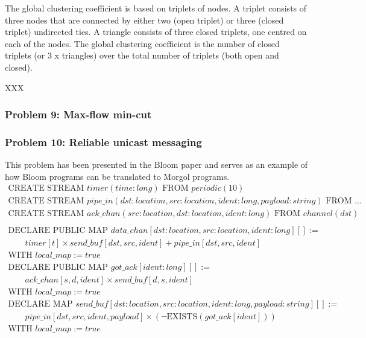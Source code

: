 \documentclass[11pt]{article}
\begin{document}
The global clustering coefficient is based on triplets of nodes. A triplet consists of three nodes that are connected by either two (open triplet) or three (closed triplet) undirected ties. A triangle consists of three closed triplets, one centred on each of the nodes. The global clustering coefficient is the number of closed triplets (or 3 x triangles) over the total number of triplets (both open and closed).

XXX

\subsubsection*{Problem 9: Max-flow min-cut} 


\subsubsection*{Problem 10: Reliable unicast messaging}
This problem has been presented in the Bloom paper and serves as an example of how Bloom programs can be translated to Morgol programs.
\[
\begin{array}{l}
\text{CREATE STREAM } timer(time: long) \text{ FROM } periodic(10) \\
\text{CREATE STREAM } pipe\_in(dst : location, src : location, ident : long, payload : string) \text{ FROM } ... \\
\text{CREATE STREAM } ack\_chan(src : location, dst : location, ident : long) \text{ FROM } channel(dst)\\
\\
\text{DECLARE PUBLIC MAP } data\_chan [dst : location, src : location, ident : long][] := \\
\qquad timer[t] \times send\_buf[dst, src, ident] + pipe\_in[dst, src, ident]\\
\text{WITH } local\_map := true \\
\text{DECLARE PUBLIC MAP } got\_ack [ident : long][] := \\
\qquad ack\_chan[s, d, ident] \times send\_buf[d, s, ident]\\
\text{WITH } local\_map := true \\
\text{DECLARE MAP } send\_buf [dst : location, src : location, ident : long, payload : string][] := \\
\qquad pipe\_in[dst, src, ident, payload] \times (\neg\text{EXISTS}(got\_ack[ident])) \\
\text{WITH } local\_map := true
\end{array}
\]
\end{document}
